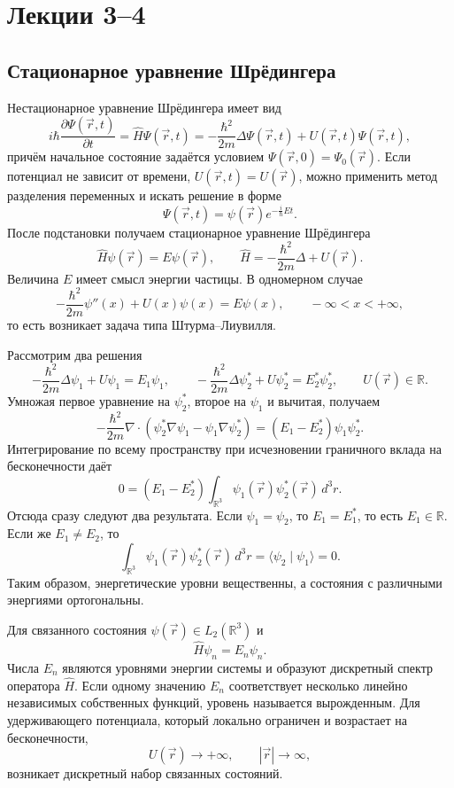 \documentclass[12pt,a4paper]{article}
\begin{document}
\section{Лекции 3--4}

\subsection{Стационарное уравнение Шрёдингера}

Нестационарное уравнение Шрёдингера имеет вид
\[
    i\hbar\frac{\partial\Psi(\vec r,t)}{\partial t}
    =\hat H\Psi(\vec r,t)
    =-\frac{\hbar^2}{2m}\Delta\Psi(\vec r,t)+U(\vec r,t)\Psi(\vec r,t),
\]
причём начальное состояние задаётся условием $\Psi(\vec r,0)=\Psi_0(\vec r)$.
Если потенциал не зависит от времени, $U(\vec r,t)=U(\vec r)$, можно применить
метод разделения переменных и искать решение в форме
\[
    \Psi(\vec r,t)=\psi(\vec r)e^{-\frac{i}{\hbar}Et}.
\]
После подстановки получаем стационарное уравнение Шрёдингера
\[
    \boxed{\hat H\psi(\vec r)=E\psi(\vec r)},
    \qquad
    \hat H=-\frac{\hbar^2}{2m}\Delta+U(\vec r).
\]
Величина $E$ имеет смысл энергии частицы. В одномерном случае
\[
    -\frac{\hbar^2}{2m}\psi''(x)+U(x)\psi(x)=E\psi(x),
    \qquad -\infty<x<+\infty,
\]
то есть возникает задача типа Штурма--Лиувилля.

Рассмотрим два решения
\[
    -\frac{\hbar^2}{2m}\Delta\psi_1+U\psi_1=E_1\psi_1,
    \qquad
    -\frac{\hbar^2}{2m}\Delta\psi_2^*+U\psi_2^*=E_2^*\psi_2^*,
    \qquad U(\vec r)\in\mathbb R.
\]
Умножая первое уравнение на $\psi_2^*$, второе на $\psi_1$ и вычитая,
получаем
\[
    -\frac{\hbar^2}{2m}\nabla\!\cdot\!
    \left(\psi_2^*\nabla\psi_1-\psi_1\nabla\psi_2^*\right)
    =(E_1-E_2^*)\psi_1\psi_2^*.
\]
Интегрирование по всему пространству при исчезновении граничного вклада
на бесконечности даёт
\[
    0=(E_1-E_2^*)\int_{\mathbb R^3}\psi_1(\vec r)\psi_2^*(\vec r)\,d^3r.
\]
Отсюда сразу следуют два результата. Если $\psi_1=\psi_2$, то $E_1=E_1^*$,
то есть $E_1\in\mathbb R$. Если же $E_1\neq E_2$, то
\[
    \int_{\mathbb R^3}\psi_1(\vec r)\psi_2^*(\vec r)\,d^3r
    =\langle\psi_2\mid\psi_1\rangle=0.
\]
Таким образом, энергетические уровни вещественны, а состояния с различными
энергиями ортогональны.

Для связанного состояния $\psi(\vec r)\in L_2(\mathbb R^3)$ и
\[
    \hat H\psi_n=E_n\psi_n.
\]
Числа $E_n$ являются уровнями энергии системы и образуют дискретный спектр
оператора $\hat H$. Если одному значению $E_n$ соответствует несколько
линейно независимых собственных функций, уровень называется вырожденным.
Для удерживающего потенциала, который локально ограничен и возрастает
на бесконечности,
\[
    U(\vec r)\longrightarrow+\infty,
    \qquad |\vec r|\longrightarrow\infty,
\]
возникает дискретный набор связанных состояний.
\end{document}
